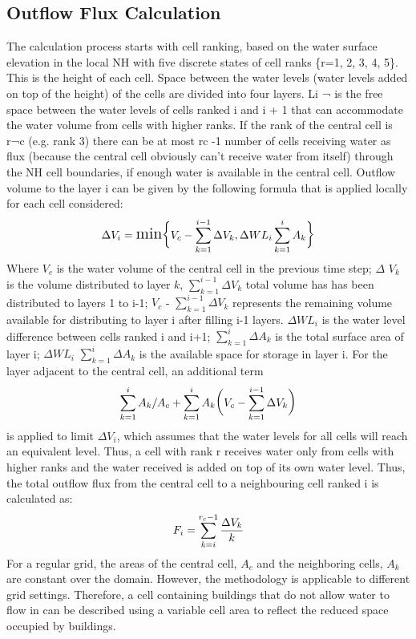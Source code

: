 \subsection*{Outflow Flux Calculation}
The calculation process starts with cell ranking, based on the water surface elevation in the local NH with five discrete states of cell ranks \{r=1, 2, 3, 4, 5\}. This is the height of each cell. Space between the water levels (water levels added on top of the height) of the cells are divided into four layers. Li ¬ is the free space between the water levels of cells ranked i and i + 1 that can accommodate the water volume from cells with higher ranks. If the rank of the central cell is r¬c (e.g. rank 3) there can be at most rc -1 number of cells receiving water as flux (because the central cell obviously can’t receive water from itself) through the NH cell boundaries, if enough water is available in the central cell. Outflow volume to the layer i can be given by the following formula that is applied locally for each cell considered: 
\begin{equation} \label{eq:1}
	\Large\Delta{V}_{i} = \text{min}\Big\{V_{c} - \sum_{k=1}^{i-1} \Delta{V}_{k}, \Delta{WL}_{i}\sum_{k=1}^{i}A_{k}\Big\}
\end{equation}
Where $V_{c}$ is the water volume of the central cell in the previous time step; $\Delta$ $V_{k}$ is the volume distributed to layer $k$, $\sum_{k=1}^{i-1}$$\Delta{V}_{k}$ total volume has has been distributed to layers 1 to i-1; $V_{c}$ - $\sum_{k=1}^{i-1}$$\Delta{V}_{k}$ represents the remaining volume available for distributing to layer i  after filling i-1 layers. $\Delta{WL}_{i}$ is the water level difference between cells ranked i and i+1;  $\sum_{k=1}^{i}$$\Delta{A}_{k}$ is the total surface area of layer i; $\Delta{WL}_{i}$  $\sum_{k=1}^{i}$$\Delta{A}_{k}$ is the available space for storage in layer i. For the layer adjacent to the central cell, an additional term
\begin{displaymath}
	\Large \sum_{k=1}^{i} A_{k}/A_{c} + \sum_{k=1}^{i} A_{k}\Big(V_{c} - \sum_{k=1}^{i-1} \Delta{V}_{k} \Big)
\end{displaymath}
is applied to limit $\Delta{V_{i}}$, which assumes that the water levels for all cells will reach an equivalent level. Thus, a cell with rank r receives water only from cells with higher ranks and the water received is added on top of its own water level. Thus, the total outflow flux from the central cell to a neighbouring cell ranked i is calculated as:
\begin{equation} \label{eq:2}
	\Large F_{i} = \sum_{k=i}^{r_{c} - 1}\frac{\Delta{V_{k}}}{k}
\end{equation}
For a regular grid, the areas of the central cell, $A_{c}$ and the neighboring cells, $A_{k}$ are constant over the domain. However, the methodology is applicable to different grid settings. Therefore, a cell containing buildings that do not allow water to flow in can be described using a variable cell area to reflect the reduced space occupied by buildings.

